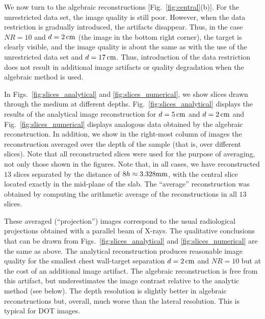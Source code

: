 We now turn to the algebraic reconstructions [Fig.~\ref{fig:central}(b)]. For the unrestricted data set, the image quality is still poor. However, when the data restriction is gradually introduced, the artifacts disappear.  Thus, in the case $NR=10$ and $d=2\,{\rm cm}$ (the image in the bottom right corner), the target is clearly visible, and the image quality is about the same as with the
use of the unrestricted data set and $d=17\,{\rm cm}$. Thus, introduction of the data restriction does not result in additional image artifacts or quality degradation when the algebraic method is
used.

In Figs.~\ref{fig:slices_analytical} and \ref{fig:slices_numerical}, we show slices drawn through the medium at different depths. Fig.~\ref{fig:slices_analytical} displays the results of the analytical image reconstruction for $d=5\,{\rm cm}$ and $d=2\,{\rm cm}$ and Fig.~\ref{fig:slices_numerical} displays analogous data obtained by the algebraic reconstruction. In addition, we show in the right-most column of images the reconstruction averaged over the depth of the sample (that is, over different slices). Note that all reconstructed slices were used for the purpose of averaging, not only those shown in the figures. Note that, in all cases, we have reconstructed $13$ slices separated by the distance of  $8h\approx 3.328{\rm mm}$, with the central slice located exactly in the mid-plane of the slab. The ``average'' reconstruction was obtained by computing the arithmetic average of the reconstructions in all $13$ slices.

These averaged (``projection'') images correspond to the usual radiological projections obtained with a parallel beam of X-rays. The qualitative conclusions that can be drawn from Figs.~\ref{fig:slices_analytical} and \ref{fig:slices_numerical} are the same as above. The analytical reconstruction produces reasonable image quality for the smallest chest wall-target separation $d=2\,{\rm
  cm}$ and $NR=10$ but at the cost of an additional image artifact. The algebraic reconstruction is free from this artifact, but underestimates the image contrast relative to the analytic method (see below). The depth resolution is slightly better in algebraic reconstructions but, overall, much worse than the lateral resolution. This is typical for DOT images.

